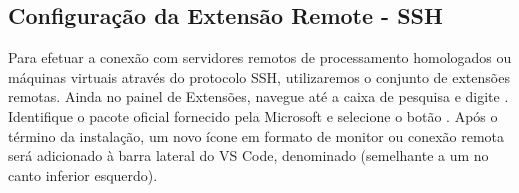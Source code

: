 \subsection*{Configuração da Extensão Remote - SSH}

Para efetuar a conexão com servidores remotos de processamento homologados ou máquinas virtuais através do protocolo SSH, utilizaremos o conjunto de extensões remotas.
Ainda no painel de Extensões, navegue até a caixa de pesquisa e digite . Identifique o pacote oficial fornecido pela Microsoft e selecione o botão . Após o término da instalação, um novo ícone em formato de monitor ou conexão remota será adicionado à barra lateral do VS Code, denominado  (semelhante a um  no canto inferior esquerdo).
